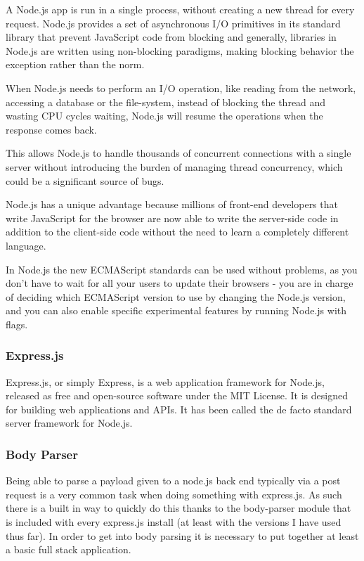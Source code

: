 \documentclass[12pt]{article}
\begin{document}
A Node.js app is run in a single process, without creating a new thread for every request. Node.js provides a set of asynchronous I/O primitives in its standard library that prevent JavaScript code from blocking and generally, libraries in Node.js are written using non-blocking paradigms, making blocking behavior the exception rather than the norm.

When Node.js needs to perform an I/O operation, like reading from the network, accessing a database or the file-system, instead of blocking the thread and wasting CPU cycles waiting, Node.js will resume the operations when the response comes back.

This allows Node.js to handle thousands of concurrent connections with a single server without introducing the burden of managing thread concurrency, which could be a significant source of bugs.

Node.js has a unique advantage because millions of front-end developers that write JavaScript for the browser are now able to write the server-side code in addition to the client-side code without the need to learn a completely different language.

In Node.js the new ECMAScript standards can be used without problems, as you don't have to wait for all your users to update their browsers - you are in charge of deciding which ECMAScript version to use by changing the Node.js version, and you can also enable specific experimental features by running Node.js with flags.\cite{nodejs}

\subsubsection{Express.js}
Express.js, or simply Express, is a web application framework for Node.js, released as free and open-source software under the MIT License. It is designed for building web applications and APIs. It has been called the de facto standard server framework for Node.js.\cite{expressjs}

\subsubsection{Body Parser}
Being able to parse a payload given to a node.js back end typically via a post request is a very common task when doing something with express.js. As such there is a built in way to quickly do this thanks to the body-parser module that is included with every express.js install (at least with the versions I have used thus far). In order to get into body parsing it is necessary to put together at least a basic full stack application.\cite{bodyparser}
\end{document}

